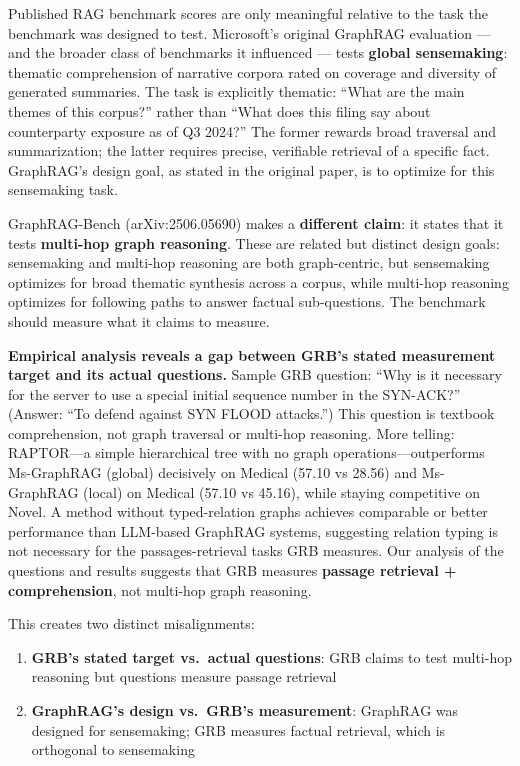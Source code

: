 Published RAG benchmark scores are only meaningful relative to the task the benchmark was designed to test. Microsoft's original GraphRAG evaluation --- and the broader class of benchmarks it influenced --- tests \textbf{global sensemaking}: thematic comprehension of narrative corpora rated on coverage and diversity of generated summaries. The task is explicitly thematic: ``What are the main themes of this corpus?'' rather than ``What does this filing say about counterparty exposure as of Q3 2024?'' The former rewards broad traversal and summarization; the latter requires precise, verifiable retrieval of a specific fact. GraphRAG's design goal, as stated in the original paper, is to optimize for this sensemaking task.

GraphRAG-Bench (arXiv:2506.05690) makes a \textbf{different claim}: it states that it tests \textbf{multi-hop graph reasoning}. These are related but distinct design goals: sensemaking and multi-hop reasoning are both graph-centric, but sensemaking optimizes for broad thematic synthesis across a corpus, while multi-hop reasoning optimizes for following paths to answer factual sub-questions. The benchmark should measure what it claims to measure.

\textbf{Empirical analysis reveals a gap between GRB's stated measurement target and its actual questions.} Sample GRB question: ``Why is it necessary for the server to use a special initial sequence number in the SYN-ACK?'' (Answer: ``To defend against SYN FLOOD attacks.'') This question is textbook comprehension, not graph traversal or multi-hop reasoning. More telling: RAPTOR---a simple hierarchical tree with no graph operations---outperforms Ms-GraphRAG (global) decisively on Medical (57.10 vs 28.56) and Ms-GraphRAG (local) on Medical (57.10 vs 45.16), while staying competitive on Novel. A method without typed-relation graphs achieves comparable or better performance than LLM-based GraphRAG systems, suggesting relation typing is not necessary for the passages-retrieval tasks GRB measures. Our analysis of the questions and results suggests that GRB measures \textbf{passage retrieval + comprehension}, not multi-hop graph reasoning.

This creates two distinct misalignments:

\begin{enumerate}
\def\labelenumi{\arabic{enumi}.}
\tightlist
\item
  \textbf{GRB's stated target vs.~actual questions}: GRB claims to test multi-hop reasoning but questions measure passage retrieval
\item
  \textbf{GraphRAG's design vs.~GRB's measurement}: GraphRAG was designed for sensemaking; GRB measures factual retrieval, which is orthogonal to sensemaking
\end{enumerate}

